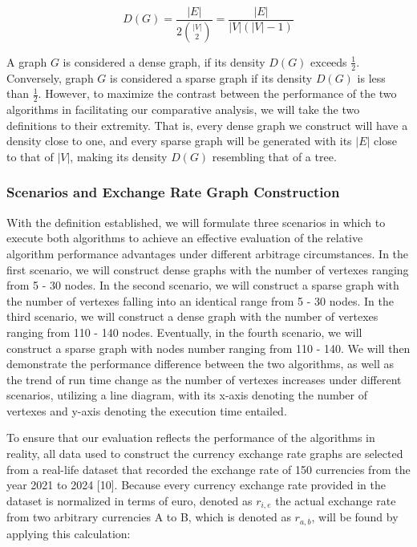 \documentclass[12pt]{article}
\begin{document}
\begin{equation}
D(G) = \frac{|E|}{2\binom{|V|}{2} } = \frac{|E|}{|V|\left(|V|-1\right)} 
\end{equation}

A graph $G$ is considered a dense graph, if its density $D(G)$ exceeds $\frac{1}{2}$. Conversely, graph $G$ is considered a sparse graph if its density $D(G)$ is less than $\frac{1}{2}$. However, to maximize the contrast between the performance of the two algorithms in facilitating our comparative analysis, we will take the two definitions to their extremity. That is, every dense graph we construct will have a density close to one, and every sparse graph will be generated with its $|E|$ close to that of $|V|$, making its density $D(G)$ resembling that of a tree.

\subsubsection{Scenarios and Exchange Rate Graph Construction}
With the definition established, we will formulate three scenarios in which to execute both algorithms to achieve an effective evaluation of the relative algorithm performance advantages under different arbitrage circumstances. In the first scenario, we will construct dense graphs with the number of vertexes ranging from 5 - 30 nodes. In the second scenario, we will construct a sparse graph with the number of vertexes falling into an identical range from 5 - 30 nodes. In the third scenario, we will construct a dense graph with the number of vertexes ranging from 110 - 140 nodes. Eventually, in the fourth scenario, we will construct a sparse graph with nodes number ranging from 110 - 140. We will then demonstrate the performance difference between the two algorithms, as well as the trend of run time change as the number of vertexes increases under different scenarios, utilizing a line diagram, with its x-axis denoting the number of vertexes and y-axis denoting the execution time entailed.

\hspace*{\fill} %

To ensure that our evaluation reflects the performance of the algorithms in reality, all data used to construct the currency exchange rate graphs are selected from a real-life dataset that recorded the exchange rate of 150 currencies from the year 2021 to 2024 [10]. Because every currency exchange rate provided in the dataset is normalized in terms of euro, denoted as $r_{i,e}$ the actual exchange rate from two arbitrary currencies A to B, which is denoted as $r_{a,b}$, will be found by applying this calculation:
\end{document}
